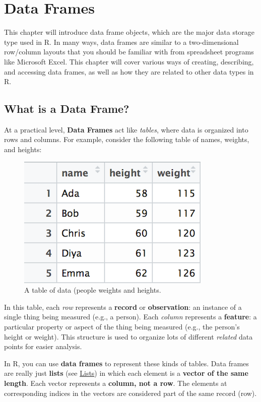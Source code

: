 \documentclass[]{book}
\theoremstyle{definition}
\theoremstyle{definition}
\theoremstyle{remark}
\begin{document}
\chapter{Data Frames}\label{dataframes}

This chapter will introduce data frame objects, which are the major data
storage type used in R. In many ways, data frames are similar to a
two-dimensional row/column layouts that you should be familiar with from
spreadsheet programs like Microsoft Excel. This chapter will cover
various ways of creating, describing, and accessing data frames, as well
as how they are related to other data types in R.

\section{What is a Data Frame?}\label{what-is-a-data-frame}

At a practical level, \textbf{Data Frames} act like \emph{tables}, where
data is organized into rows and columns. For example, consider the
following table of names, weights, and heights:

\begin{figure}
\centering
\includegraphics{img/dataframes/table-example.png}
\caption{A table of data (people weights and heights.}
\end{figure}

In this table, each \emph{row} represents a \textbf{record} or
\textbf{observation}: an instance of a single thing being measured
(e.g., a person). Each \emph{column} represents a \textbf{feature}: a
particular property or aspect of the thing being measured (e.g., the
person's height or weight). This structure is used to organize lots of
different \emph{related} data points for easier analysis.

In R, you can use \textbf{data frames} to represent these kinds of
tables. Data frames are really just \textbf{lists} (see
\protect\hyperlink{lists}{Lists}) in which each element is a
\textbf{vector of the same length}. Each vector represents a
\textbf{column, not a row}. The elements at corresponding indices in the
vectors are considered part of the same record (row).
\end{document}
